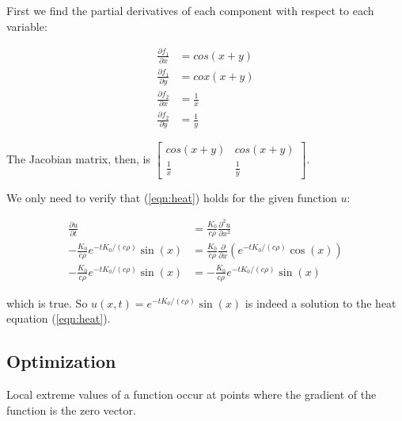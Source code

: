 \item

First we find the partial derivatives of each component with respect to each
variable:

 \begin{align*}
  \frac{\partial f_1}{\partial x} &= cos(x + y) \\
  \frac{\partial f_1}{\partial y} &= cox(x + y) \\
  \frac{\partial f_2}{\partial x} &= \frac{1}{x} \\
  \frac{\partial f_2}{\partial y} &= \frac{1}{y}
 \end{align*}

The Jacobian matrix, then, is
$\begin{bmatrix}
 cos(x + y) & cos(x + y) \\ \frac{1}{x} & \frac{1}{y}
\end{bmatrix}$.

\item

We only need to verify that (\ref{eqn:heat}) holds for the given function $u$:

\begin{align*}
 \frac{\partial u}{\partial t} &= \frac{K_0}{c\rho} \frac{\partial^2 u}{\partial x^2} \\
 -\frac{K_0}{c\rho}e^{-tK_0/(c\rho)}\sin(x) &=
 \frac{K_0}{c\rho}\frac{\partial}{\partial x}(e^{-tK_0/(c\rho)}\cos(x)) \\
 -\frac{K_0}{c\rho}e^{-tK_0/(c\rho)}\sin(x) &=
 -\frac{K_0}{c\rho}e^{-tK_0/(c\rho)}\sin(x)
\end{align*}

which is true.  So $u(x,t) = e^{-tK_0/(c\rho)}\sin(x)$ is indeed a solution
to the heat equation (\ref{eqn:heat}).

\EEN %

\newpage

\subsection{Optimization}

\BEN


\item

Local extreme values of a function occur at points where the gradient of
the function is the zero vector.

